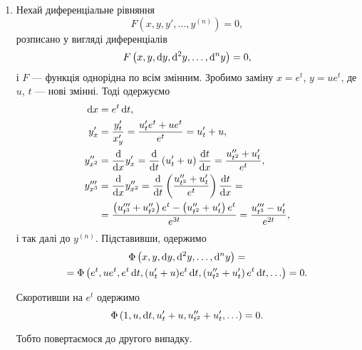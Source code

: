 \begin{enumerate}
    \item Нехай диференціальне рівняння
    \begin{equation*}
    	F \left( x, y, y', \ldots, y^{(n)} \right) = 0,
    \end{equation*}
    розписано у вигляді диференціалів
    \begin{equation*}
    	F \left( x, y, \mathop{}\!\mathrm{d} y, \mathop{}\!\mathrm{d}^2 y , \ldots, \mathop{}\!\mathrm{d}^n y \right) = 0,
    \end{equation*}
    і $F$ --- функція однорідна по всім змінним. Зробимо заміну $x = e^t$, $y = u  e^t$, де $u$, $t$ --- нові змінні. Тоді одержуємо
    \begin{align*}
    	\diff x &= e^t \diff t, \\
    	y_x^\prime &=  \frac{y_t^\prime}{x_y^\prime} = \frac{u_t^\prime e^t + u e^t}{e^t} = u_t^\prime + u, \\
    	y_{x^2}^{\prime\prime} &= \frac{\diff}{\diff x}  y_x^\prime = \frac{\diff}{\diff t} \left( u_t^\prime + u \right)  \frac{\diff t}{\diff x} = \frac{u_{t^2}^{\prime\prime} + u_t^\prime}{e^t}, \\
    	y_{x^3}^{\prime\prime\prime} &= \frac{\diff}{\diff x}  y_{x^2}^{\prime\prime} = \frac{\diff}{\diff t} \left( \frac{u_{t^2}^{\prime\prime} + u_t^\prime }{e^t} \right)  \frac{\diff t}{\diff x} = \\
    	&= \frac{\left( u_{t^3}^{\prime\prime\prime} + u_{t^2}^{\prime\prime} \right) e^t - \left( u_{t^2}^{\prime\prime} + u_t^\prime \right) e^t}{e^{3t}} = \frac{u_{t^3}^{\prime\prime\prime} - u_t^\prime}{e^{2t}}, \nonumber
    \end{align*}
    і так далі до $y^{(n)}$. Підставивши, одержимо
    \begin{multline*}
    	\Phi \left(x, y, \mathop{}\!\mathrm{d} y, \mathop{}\!\mathrm{d}^2 y, \ldots, \mathop{}\!\mathrm{d}^n y\right) = \\
    	= \Phi\left( e^t, u e^t, e^t \mathop{}\!\mathrm{d} t, (u_t^\prime + u)e^t \mathop{}\!\mathrm{d} t, \left(u_{t^2}^{\prime\prime} + u_t^\prime\right) e^t \mathop{}\!\mathrm{d} t, \ldots\right) = 0.
    \end{multline*} 
    
    Скоротивши на $e^t$ одержимо
    \begin{equation*}
    	\Phi\left( 1, u, \mathop{}\!\mathrm{d} t, u_t^\prime + u, u_{t^2}^{\prime\prime} + u_t^\prime, \ldots\right) = 0.
    \end{equation*} 
    
    Тобто повертаємося до другого випадку.
\end{enumerate}